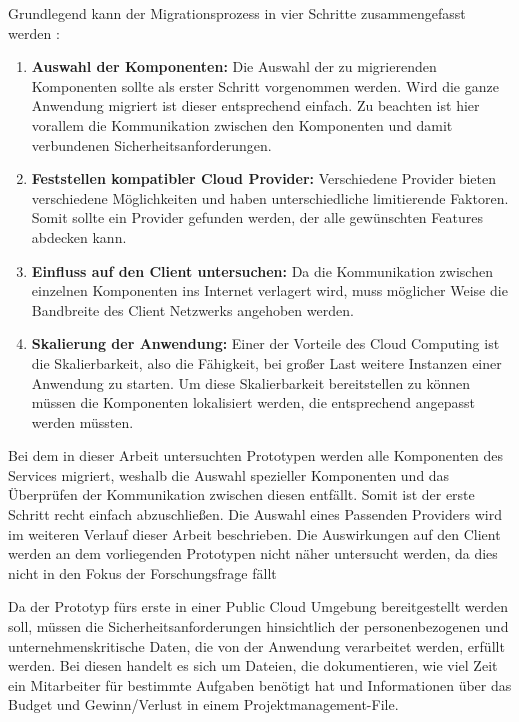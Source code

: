 Grundlegend kann der Migrationsprozess  in vier Schritte zusammengefasst werden \cite[Vgl. auch im Folgenden][S. 34f]{Maenhaut2016}:
\begin{enumerate}
\item \textbf{Auswahl der Komponenten:} Die Auswahl der zu migrierenden Komponenten sollte als erster Schritt vorgenommen werden. Wird die ganze Anwendung migriert ist dieser entsprechend einfach. Zu beachten ist hier vorallem die Kommunikation zwischen den Komponenten und damit verbundenen Sicherheitsanforderungen.
\item \textbf{Feststellen kompatibler Cloud Provider:} Verschiedene Provider bieten verschiedene Möglichkeiten und haben unterschiedliche limitierende Faktoren. Somit sollte ein Provider gefunden werden, der alle gewünschten Features abdecken kann.
\item \textbf{Einfluss auf den Client untersuchen:} Da die Kommunikation zwischen einzelnen Komponenten ins Internet verlagert wird, muss möglicher Weise die Bandbreite des Client Netzwerks angehoben werden.
\item \textbf{Skalierung der Anwendung:} Einer der Vorteile des Cloud Computing ist die Skalierbarkeit, also die Fähigkeit, bei großer Last weitere Instanzen einer Anwendung zu starten. Um diese Skalierbarkeit bereitstellen zu können müssen die Komponenten lokalisiert werden, die entsprechend angepasst werden müssten.
\end{enumerate}


Bei dem in dieser Arbeit untersuchten Prototypen werden alle Komponenten des Services migriert, weshalb die Auswahl spezieller Komponenten und das Überprüfen der Kommunikation zwischen diesen entfällt. Somit ist der erste Schritt recht einfach abzuschließen. Die Auswahl eines Passenden Providers wird im weiteren Verlauf dieser Arbeit beschrieben. Die Auswirkungen auf den Client werden an dem vorliegenden Prototypen nicht näher untersucht werden, da dies nicht in den Fokus der Forschungsfrage fällt \pagebreak

Da der Prototyp fürs erste in einer Public Cloud Umgebung bereitgestellt werden soll, müssen die Sicherheitsanforderungen hinsichtlich der personenbezogenen und unternehmenskritische Daten, die von der Anwendung verarbeitet werden, erfüllt werden. Bei diesen handelt es sich um Dateien, die dokumentieren, wie viel Zeit ein Mitarbeiter für bestimmte Aufgaben benötigt hat und Informationen über das Budget und Gewinn/Verlust in einem Projektmanagement-File.

